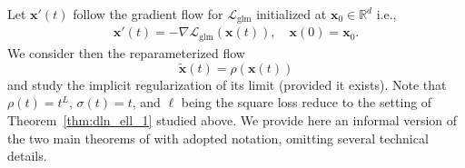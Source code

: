 \documentclass{svproc}
\newcommand{\corr}[1]{#1}
\newcommand{\bx}{\boldsymbol{x}}
\newcommand{\bz}{\boldsymbol{z}}
\newcommand{\0}{\boldsymbol{0}}
\newcommand{\1}{\boldsymbol{1}}
\def\Lgl{\mathcal{L}_\text{glm}}
\def\sigmainn{\rho}
\def\sigmaout{\sigma}
\begin{document}
Let $\bx'(t)$ follow the gradient flow for $\Lgl$ initialized at $\bx_0 \in \mathbb{R}^d$ i.e.,
    \begin{align}\label{eq:gd_IRERM}
       \bx'(t) = -\nabla\Lgl(\bx(t)), \quad \bx(0)=\bx_0.
    \end{align}
We consider then the reparameterized flow 
\begin{equation}\label{reparam-x}
\widetilde{\bx} (t) = \sigmainn(\bx (t))
\end{equation}
and study the implicit regularization of \corr{its} limit (provided it exists). Note that $\sigmainn(t) = t^L$, $\sigmaout(t) = t$\corr{,} and $\ell$ being the square loss reduce to the setting of Theorem~\ref{thm:dln_ell_1} studied above.
We provide here an informal version of the two main theorems of \cite{chou2024induce} with adopted notation, omitting several technical details.
\end{document}
